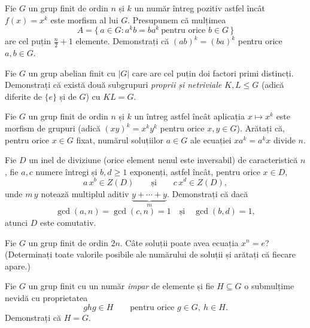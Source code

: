 \begin{problema}
Fie $G$ un grup finit de ordin $n$ și $k$ un număr întreg
pozitiv astfel încât $f(x)=x^{k}$ este morfism al lui $G$.
Presupunem că mulțimea
\[
  A = \{\, a \in G : a^{k}b = ba^{k} \ \text{pentru orice } b \in G \,\}
\]
are cel puțin $\tfrac{n}{2}+1$ elemente. Demonstrați că
$(ab)^{k}=(ba)^{k}$ pentru orice $a,b \in G$.
\end{problema}

\begin{problema}
Fie $G$ un grup abelian finit cu $|G|$ care are cel puțin doi factori
primi distincți. Demonstrați că există două subgrupuri
\emph{proprii și netriviale} $K,L\le G$ (adică diferite de $\{e\}$ și de $G$) cu $KL=G$.
\end{problema}

\begin{problema}
Fie $G$ un grup finit de ordin $n$ și $k$ un întreg astfel încât
aplicația $x\mapsto x^{k}$ este morfism de grupuri (adică
$(xy)^{k}=x^{k}y^{k}$ pentru orice $x,y\in G$). Arătați că, pentru
orice $x\in G$ fixat, numărul soluțiilor $a\in G$ ale ecuației
$xa^{k}=a^{k}x$ divide $n$.
\end{problema}

\begin{problema}
Fie $D$ un inel de diviziune (orice element nenul este inversabil) de
caracteristică $n$, fie $a,c$ numere întregi și $b,d\ge 1$
exponenți, astfel încât, pentru orice $x\in D$,
\[
  a\,x^{b}\in Z(D)\qquad\text{și}\qquad c\,x^{d}\in Z(D),
\]
unde $m\,y$ notează multiplul aditiv $\underbrace{y+\cdots+y}_{m}$.
Demonstrați că dacă
\[
  \gcd(a,n)=\gcd(c,n)=1\quad\text{și}\quad \gcd(b,d)=1,
\]
atunci $D$ este comutativ.
\end{problema}

\setcounter{cat}{3}\setcounter{problemaX}{0}

\begin{problema}
Fie $G$ un grup finit de ordin $2n$. Câte soluții poate avea
ecuația $x^{n}=e$? (Determinați toate valorile posibile ale
numărului de soluții și arătați că fiecare apare.)
\end{problema}

\begin{problema}
Fie $G$ un grup finit cu un număr \emph{impar} de elemente și fie
$H \subseteq G$ o submulțime nevidă cu proprietatea
\[
  ghg \in H \qquad \text{pentru orice } g \in G,\ h \in H.
\]
Demonstrați că $H = G$.
\end{problema}

